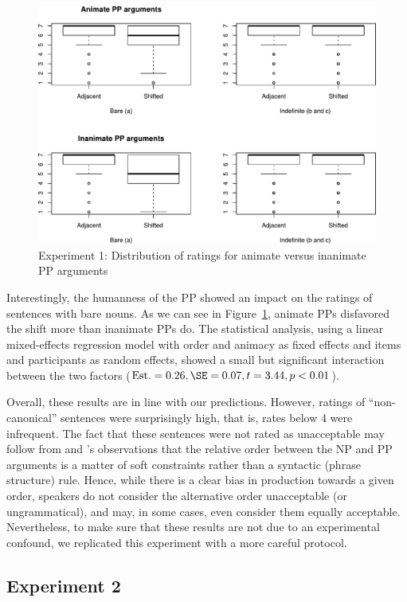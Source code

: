 \documentclass[output=paper]{langsci/langscibook}
\begin{document}
\begin{figure}
    \includegraphics[width=1\linewidth]{plots/Rplot02-Exp1.pdf}
	\caption{Experiment 1: Distribution of ratings for animate versus inanimate PP arguments}\label{boxplot12}
\end{figure}

Interestingly, the humanness of the PP showed an impact on the ratings of sentences with bare nouns. As we can see in Figure~\ref{boxplot12}, animate PPs disfavored the shift more than inanimate PPs do. The statistical analysis, using a linear mixed-effects regression model with order and animacy as fixed effects and items and participants as random effects, showed a small but significant interaction between the two factors ($\text{Est.}= 0.26, \SE=0.07, t=3.44, p<0.01$). 


Overall, these results are in line with our predictions.  However,
ratings of ``non-canonical'' sentences were surprisingly high, that
is, rates below 4 were infrequent.  The fact that these sentences were
not rated as unacceptable may follow from \citet{FaghiriPhd} and
\citeauthor{FagSamHem2018}'s \citeyear{FagSamHem2018} observations
that the relative order between the NP and PP arguments is a matter of
soft constraints rather than a syntactic (phrase structure) rule.
Hence, while there is a clear bias in production towards a given
order, speakers do not consider the alternative order unacceptable (or
ungrammatical), and may, in some cases, even consider them equally
acceptable.  Nevertheless, to make sure that these results are not due
to an experimental confound, we replicated this experiment with a more
careful protocol.

\subsection{Experiment 2}
\end{document}
